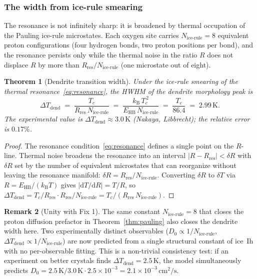 \documentclass[11pt,letterpaper]{article}
\theoremstyle{plain}
\newtheorem{theorem}{Theorem}[section]
\theoremstyle{definition}
\newtheorem{remark}[theorem]{Remark}
\newcommand{\kB}{k_{\mathrm{B}}}
\begin{document}
\subsubsection*{The width from ice-rule smearing}

The resonance is not infinitely sharp: it is broadened by thermal
occupation of the Pauling ice-rule microstates.  Each oxygen site
carries $N_{\text{ice-rule}}=8$ equivalent proton configurations
(four hydrogen bonds, two proton positions per bond), and the
resonance persists only while the thermal noise in the ratio $R$
does not displace $R$ by more than $R_{\text{res}}/N_{\text{ice-rule}}$
(one microstate out of eight).

\begin{theorem}[Dendrite transition width]\label{thm:dendrite-width}
Under the ice-rule smearing of the thermal resonance~\eqref{eq:resonance},
the HWHM of the dendrite morphology peak is
\begin{equation}\label{eq:dT-dendrite}
  \boxed{\;\Delta T_{\text{dend}}
    \;=\; \frac{T_c}{R_{\text{res}}\,N_{\text{ice-rule}}}
    \;=\; \frac{\kB\,T_c^{\,2}}{E_{\text{HB}}\,N_{\text{ice-rule}}}
    \;=\; \frac{T_c}{86.4}
    \;=\; 2.99\,\mathrm{K}.\;}
\end{equation}
The experimental value is $\Delta T_{\text{dend}}\approx 3.0\,\mathrm{K}$
(Nakaya, Libbrecht); the relative error is $0.17\%$.
\end{theorem}

\begin{proof}
The resonance condition~\eqref{eq:resonance} defines a single point
on the $R$-line.  Thermal noise broadens the resonance into an
interval $|R - R_{\text{res}}| < \delta R$ with $\delta R$ set by
the number of equivalent microstates that can reorganize without
leaving the resonance manifold: $\delta R = R_{\text{res}}/N_{\text{ice-rule}}$.
Converting $\delta R$ to $\delta T$ via $R = E_{\text{HB}}/(\kB T)$
gives $|\mathrm{d}T/\mathrm{d}R| = T/R$, so
$\Delta T_{\text{dend}} = T_c/R_{\text{res}}\cdot R_{\text{res}}/N_{\text{ice-rule}}
= T_c/(R_{\text{res}}\,N_{\text{ice-rule}})$.
\end{proof}

\begin{remark}[Unity with Fix 1]
The same constant $N_{\text{ice-rule}}=8$ that closes the proton
diffusion prefactor in Theorem~\ref{thm:pauling} also closes the
dendrite width here.  Two experimentally distinct observables
($D_0\propto 1/N_{\text{ice-rule}}$, $\Delta T_{\text{dend}}\propto
1/N_{\text{ice-rule}}$) are now predicted from a single structural
constant of ice~Ih with no per-observable fitting.  This is a
non-trivial consistency test: if an experiment on better crystals
finds $\Delta T_{\text{dend}} = 2.5\,\mathrm{K}$, the model
simultaneously predicts $D_0 = 2.5\,\mathrm{K}/3.0\,\mathrm{K}\cdot
2.5\times 10^{-3} = 2.1\times 10^{-3}\,\mathrm{cm}^2/\mathrm{s}$.
\end{remark}
\end{document}
